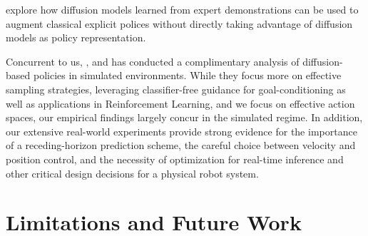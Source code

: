 \documentclass[Afour,sageh,times]{sagej}
\begin{document}
\citet{wang2023diffusion} explore how diffusion models learned from expert demonstrations can be used to augment classical explicit polices without directly taking advantage of diffusion models as policy representation.

Concurrent to us, \citet{pearce2023imitating}, \citet{reuss2023goal} and \citet{hansen2023idql} has conducted a complimentary analysis of diffusion-based policies in simulated environments. While they focus more on effective sampling strategies, leveraging classifier-free guidance for goal-conditioning as well as applications in Reinforcement Learning, and we focus on effective action spaces, our empirical findings largely concur in the simulated regime.  In addition, our extensive real-world experiments provide strong evidence for the importance of a receding-horizon prediction scheme, the careful choice between velocity and position control, and the necessity of optimization for real-time inference and other critical design decisions for a physical robot system.

\section{Limitations and Future Work}
\end{document}
